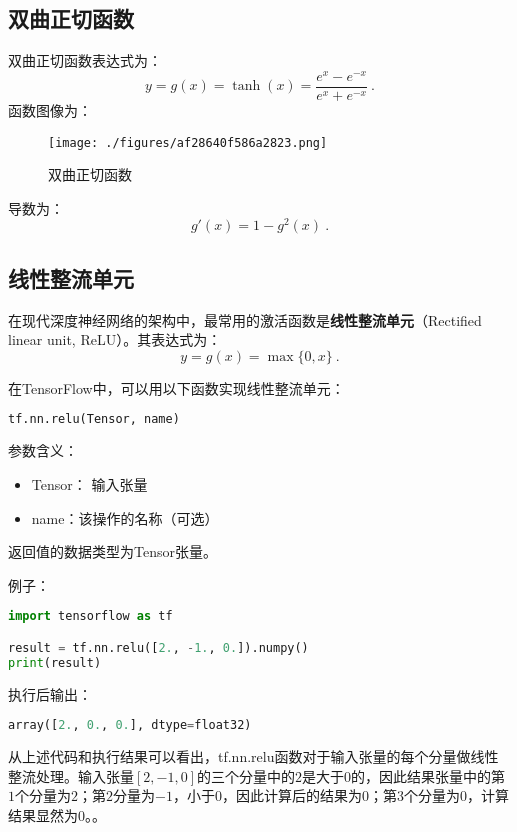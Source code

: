 \subsection{双曲正切函数}
双曲正切函数表达式为：
\begin{equation}
y=g(x)=\tanh(x)=\frac{e^x-e^{-x}}{e^x+e^{-x}}~.
\end{equation}
函数图像为：
\begin{figure}[ht]
\centering
\texttt{[image: ./figures/af28640f586a2823.png]}
\caption{双曲正切函数} \label{fig_ActFun3}
\end{figure}
导数为：
\begin{equation}
g'(x)=1-g^2(x)~.
\end{equation}

\subsection{线性整流单元}
在现代深度神经网络的架构中，最常用的激活函数是\textbf{线性整流单元}（Rectified linear unit, ReLU）。其表达式为：
\begin{equation}
y=g(x)=\max\{0,x\}~.
\end{equation}

在TensorFlow中，可以用以下函数实现线性整流单元：
\begin{lstlisting}[language=python]
tf.nn.relu(Tensor, name)
\end{lstlisting}

参数含义：
\begin{itemize}
\item Tensor： 输入张量
\item name：该操作的名称（可选）
\end{itemize}
返回值的数据类型为Tensor张量。

例子：
\begin{lstlisting}[language=python]
import tensorflow as tf

result = tf.nn.relu([2., -1., 0.]).numpy()
print(result)
\end{lstlisting}
执行后输出：
\begin{lstlisting}[language=python]
array([2., 0., 0.], dtype=float32)
\end{lstlisting}

从上述代码和执行结果可以看出，tf.nn.relu函数对于输入张量的每个分量做线性整流处理。输入张量$[2, -1, 0]$的三个分量中的$2$是大于$0$的，因此结果张量中的第$1$个分量为$2$；第$2$分量为$-1$，小于$0$，因此计算后的结果为$0$；第$3$个分量为$0$，计算结果显然为$0$。。
